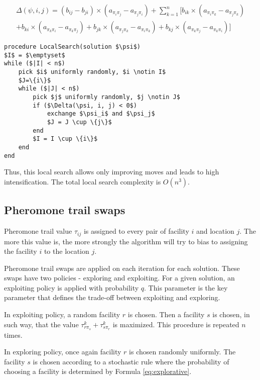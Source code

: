 \documentclass[12pt]{article}
\begin{document}
\begin{multline}
\Delta(\psi,i,j) = (b_{ij} - b_{ji}) \times (a_{\pi_i\pi_j} - a_{\pi_j\pi_i}) + \sum_{k = 1}^{n} [b_{ik} \times (a_{\pi_i\pi_k} - a_{\pi_j\pi_k}) \\+ b_{ki} \times (a_{\pi_k\pi_i} - a_{\pi_k\pi_j}) 
 + b_{jk} \times (a_{\pi_j\pi_k} - a_{\pi_i\pi_k}) + b_{kj} \times (a_{\pi_k\pi_j} - a_{\pi_k\pi_i})]
\label{eq:delta}
\end{multline}

\begin{minipage}[c]{0.95\textwidth}
\begin{lstlisting}[caption={Local Search pseudo-code}, label={lst:local-search},mathescape]
procedure LocalSearch(solution $\psi$)
$I$ = $\emptyset$
while ($|I| < n$)
	pick $i$ uniformly randomly, $i \notin I$
	$J=\{i\}$
	while ($|J| < n$)
		pick $j$ uniformly randomly, $j \notin J$
		if ($\Delta(\psi, i, j) < 0$)
			exchange $\psi_i$ and $\psi_j$
			$J = J \cup \{j\}$
		end
		$I = I \cup \{i\}$
	end
end
\end{lstlisting}
\end{minipage}

Thus, this local search allows only improving moves and leads to high intensification. The total local search complexity is $O(n^3)$.

\subsection{Pheromone trail swaps}

Pheromone trail value $\tau_{ij}$ is assigned to every pair of facility $i$ and location $j$. The more this value is, the more strongly the algorithm will try to bias to assigning the facility $i$ to the location $j$.

Pheromone trail swaps are applied on each iteration for each solution. These swaps have two policies - exploring and exploiting. For a given solution, an exploiting policy is applied with probability $q$. This parameter is the key parameter that defines the trade-off between exploiting and exploring.

In exploiting policy, a random facility $r$ is chosen. Then a facility $s$ is chosen, in such way, that the value $\tau_{r\pi_s}^k + \tau_{s\pi_r}^k$ is maximized. This procedure is repeated $n$ times. 

In exploring policy, once again facility $r$ is chosen randomly uniformly. The facility $s$ is chosen according to a stochastic rule where the probability of choosing a facility is determined by Formula \ref{eq:explorative}.
\end{document}
